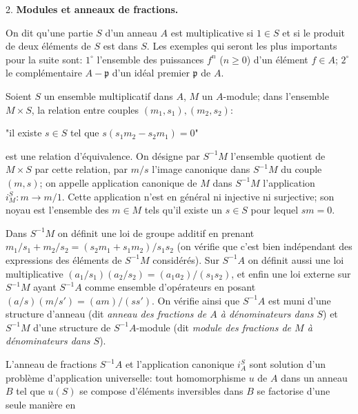 \newpage



2. \textbf{Modules et anneaux de fractions.}

On dit qu'une partie $S$ d'un anneau $A$ est multiplicative si $1 \in S$ et si le produit de deux éléments de $S$ est dans $S$. Les exemples qui seront les plus importants pour la suite sont: $1^\circ$ l'ensemble des puissances $f^n$ ($n \geq 0$) d'un élément $f \in A$; $2^\circ$ le complémentaire $A - \mathfrak{p}$ d'un idéal premier $\mathfrak{p}$ de $A$.

Soient $S$ un ensemble multiplicatif dans $A$, $M$ un $A$-module; dans l'ensemble $M \times S$, la relation entre couples $(m_1, s_1), (m_2, s_2)$:

"il existe $s \in S$ tel que $s(s_1m_2 - s_2m_1) = 0$"

est une relation d'équivalence. On désigne par $S^{-1}M$ l'ensemble quotient de $M \times S$ par cette relation, par $m/s$ l'image canonique dans $S^{-1}M$ du couple $(m, s)$; on appelle application canonique de $M$ dans $S^{-1}M$ l'application $i_M^S: m \to m/1$. Cette application n'est en général ni injective ni surjective; son noyau est l'ensemble des $m \in M$ tels qu'il existe un $s \in S$ pour lequel $sm = 0$.

Dans $S^{-1}M$ on définit une loi de groupe additif en prenant $m_1/s_1 + m_2/s_2 = (s_2m_1 + s_1m_2)/s_1s_2$ (on vérifie que c'est bien indépendant des expressions des éléments de $S^{-1}M$ considérés). Sur $S^{-1}A$ on définit aussi une loi multiplicative $(a_1/s_1)(a_2/s_2) = (a_1a_2)/(s_1s_2)$, et enfin une loi externe sur $S^{-1}M$ ayant $S^{-1}A$ comme ensemble d'opérateurs en posant $(a/s)(m/s') = (am)/(ss')$. On vérifie ainsi que $S^{-1}A$ est muni d'une structure d'anneau (dit \emph{anneau des fractions de $A$ à dénominateurs dans $S$}) et $S^{-1}M$ d'une structure de $S^{-1}A$-module (dit \emph{module des fractions de $M$ à dénominateurs dans $S$}).

L'anneau de fractions $S^{-1}A$ et l'application canonique $i_A^S$ sont solution d'un problème d'application universelle: tout homomorphisme $u$ de $A$ dans un anneau $B$ tel que $u(S)$ se compose d'éléments inversibles dans $B$ se factorise d'une seule manière en


